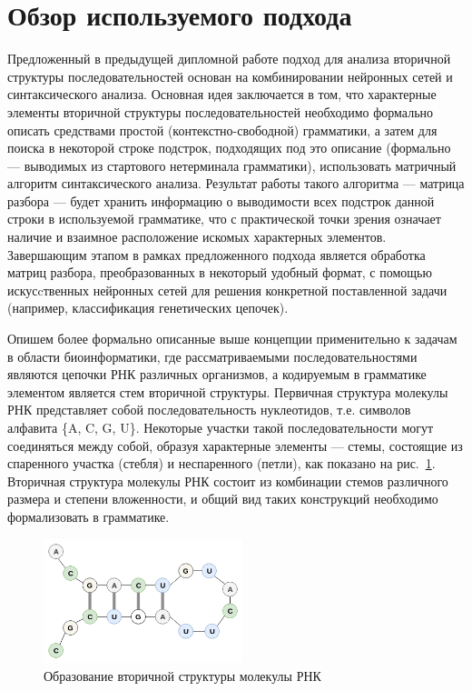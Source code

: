 \documentclass[14pt]{matmex-diploma-custom}
\begin{document}
\section{Обзор используемого подхода}
Предложенный в предыдущей дипломной работе подход для анализа вторичной структуры последовательностей основан на комбинировании нейронных сетей и синтаксического анализа. Основная идея заключается в том, что характерные элементы вторичной структуры последовательностей необходимо формально описать средствами простой (контекстно-свободной) грамматики, а затем для поиска в некоторой строке подстрок, подходящих под это описание (формально --- выводимых из стартового нетерминала грамматики), использовать матричный алгоритм синтаксического анализа. Результат работы такого алгоритма --- матрица разбора --- будет хранить информацию о выводимости всех подстрок данной строки в используемой грамматике, что с практической точки зрения означает наличие и взаимное расположение искомых характерных элементов. Завершающим этапом в рамках предложенного подхода является обработка матриц разбора, преобразованных в некоторый удобный формат, с помощью искусcтвенных нейронных сетей для решения конкретной поставленной задачи (например, классификация генетических цепочек). 

Опишем более формально описанные выше концепции применительно к задачам в области биоинформатики, где рассматриваемыми последовательностями являются цепочки РНК различных организмов, а кодируемым в грамматике элементом является стем вторичной структуры. Первичная структура молекулы РНК представляет собой последовательность нуклеотидов, т.е. символов алфавита \{A, C, G, U\}. Некоторые участки такой последовательности могут соединяться между собой, образуя характерные элементы --- стемы, состоящие из спаренного участка (стебля) и неспаренного (петли), как показано на рис.~\ref{molekula}. Вторичная структура молекулы РНК состоит из комбинации стемов различного размера и степени вложенности, и общий вид таких конструкций необходимо формализовать в грамматике.

\begin{figure}[h]
\begin{center}
\centering
\includegraphics[width=5.8cm]{pics/molekula.png}
\caption{Образование вторичной структуры молекулы РНК}
\label{molekula}
\end{center}
\end{figure} 
\end{document}
